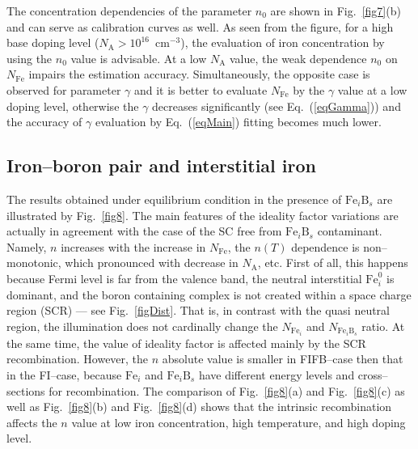 \documentclass [sort&compress] {elsarticle}
\begin{document}
The concentration dependencies of the parameter $n_0$ are shown in Fig.~\ref{fig7}(b) and can serve as calibration curves as well.
As seen from the figure, for a high base doping level ($N_\mathrm{A}>10^{16}$~cm$^{-3}$), the evaluation of iron concentration by using the $n_0$ value is advisable.
At a low $N_\mathrm{A}$ value, the weak dependence $n_0$ on $N_\mathrm{Fe}$ impairs the estimation accuracy.
Simultaneously, the opposite case is observed for parameter $\gamma$ and
it is better to evaluate  $N_\mathrm{Fe}$ by the $\gamma$ value at a low doping level,
otherwise the $\gamma$ decreases significantly (see Eq.~(\ref{eqGamma})) and the accuracy of $\gamma$ evaluation by Eq.~(\ref{eqMain}) fitting becomes much lower.


\subsection{Iron--boron pair and interstitial iron}

The results obtained under equilibrium condition in the presence of $\mathrm{Fe}_i\mathrm{B}_s$ are illustrated by Fig.~\ref{fig8}.
The main features of the ideality factor variations are actually in agreement with the case of the SC free from $\mathrm{Fe}_i\mathrm{B}_s$ contaminant.
Namely, $n$ increases with the increase in $N_\mathrm{Fe}$, the $n(T)$ dependence is non--monotonic, which pronounced with decrease in $N_\mathrm{A}$, etc.
First of all, this happens because Fermi level is far from the valence band, the neutral  interstitial $\mathrm{Fe}_i^0$ is dominant,
and the boron containing complex is  not created within a space charge region (SCR) --- see Fig.~\ref{figDist}.
That is, in contrast with the quasi neutral region, the illumination does not cardinally change  the $N_{\mathrm{Fe}_i}$ and $N_{\mathrm{Fe}_i\mathrm{B}_s}$ ratio.
At the same time, the value of ideality factor is affected mainly by the SCR recombination.
However, the $n$ absolute  value  is smaller in FIFB--case then that in the FI--case, because $\mathrm{Fe}_i$ and $\mathrm{Fe}_i\mathrm{B}_s$ have different energy levels and cross--sections for recombination.
The comparison of Fig.~\ref{fig8}(a) and Fig.~\ref{fig8}(c) as well as  Fig.~\ref{fig8}(b) and Fig.~\ref{fig8}(d)
shows that the intrinsic recombination affects the $n$ value at low iron concentration, high temperature, and high doping level.
\end{document}
